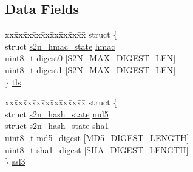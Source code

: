 \subsection*{Data Fields}
\begin{DoxyCompactItemize}
\item 
\begin{tabbing}
xx\=xx\=xx\=xx\=xx\=xx\=xx\=xx\=xx\=\kill
struct \{\\
\>struct \hyperlink{structs2n__hmac__state}{s2n\_hmac\_state} \hyperlink{unions2n__prf__working__space_ab670d77ffcc4e14502b41811d2385dc9}{hmac}\\
\>uint8\_t \hyperlink{unions2n__prf__working__space_a16b7ee508a903d1d994b21e2e501145a}{digest0} \mbox{[}\hyperlink{s2n__prf_8h_a6e72344ee5c9fe106257b029521e675e}{S2N\_MAX\_DIGEST\_LEN}\mbox{]}\\
\>uint8\_t \hyperlink{unions2n__prf__working__space_a92a247fdaf3682c6128d6b5efbcf0c9c}{digest1} \mbox{[}\hyperlink{s2n__prf_8h_a6e72344ee5c9fe106257b029521e675e}{S2N\_MAX\_DIGEST\_LEN}\mbox{]}\\
\} \hyperlink{unions2n__prf__working__space_a1ced0527b66f71d400b770e8c811e789}{tls}\\

\end{tabbing}\item 
\begin{tabbing}
xx\=xx\=xx\=xx\=xx\=xx\=xx\=xx\=xx\=\kill
struct \{\\
\>struct \hyperlink{structs2n__hash__state}{s2n\_hash\_state} \hyperlink{unions2n__prf__working__space_aef86a1eeef902f13a68011b824cfe662}{md5}\\
\>struct \hyperlink{structs2n__hash__state}{s2n\_hash\_state} \hyperlink{unions2n__prf__working__space_a6cc3a653d5553d51a2c56300e3679a37}{sha1}\\
\>uint8\_t \hyperlink{unions2n__prf__working__space_adb2d4929ba397ee1f0014a5c946c4c90}{md5\_digest} \mbox{[}\hyperlink{include_2openssl_2md5_8h_a09a4f4b2f28cbe522d9b80153666029c}{MD5\_DIGEST\_LENGTH}\mbox{]}\\
\>uint8\_t \hyperlink{unions2n__prf__working__space_aafe84edb27d60fa2bfa80666cb471f61}{sha1\_digest} \mbox{[}\hyperlink{include_2openssl_2sha_8h_a1a715db7b4403fe6c165e49a32f5fe3d}{SHA\_DIGEST\_LENGTH}\mbox{]}\\
\} \hyperlink{unions2n__prf__working__space_a69a67fe1079d52ab6ddb417f6256810d}{ssl3}\\

\end{tabbing}\end{DoxyCompactItemize}


